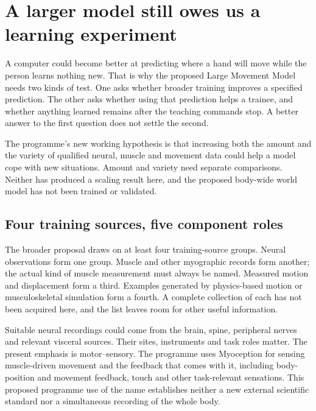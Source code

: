 \section{A larger model still owes us a learning experiment}

A computer could become better at predicting where a hand will move while the person learns nothing new. That is why the proposed Large Movement Model needs two kinds of test. One asks whether broader training improves a specified prediction. The other asks whether using that prediction helps a trainee, and whether anything learned remains after the teaching commands stop. A better answer to the first question does not settle the second.

The programme's new working hypothesis is that increasing both the amount and the variety of qualified neural, muscle and movement data could help a model cope with new situations. Amount and variety need separate comparisons. Neither has produced a scaling result here, and the proposed body-wide world model has not been trained or validated.

\subsection{Four training sources, five component roles}

The broader proposal draws on at least four training-source groups. Neural observations form one group. Muscle and other myographic records form another; the actual kind of muscle measurement must always be named. Measured motion and displacement form a third. Examples generated by physics-based motion or musculoskeletal simulation form a fourth. A complete collection of each has not been acquired here, and the list leaves room for other useful information.

Suitable neural recordings could come from the brain, spine, peripheral nerves and relevant visceral sources. Their sites, instruments and task roles matter. The present emphasis is motor--sensory. The programme uses Myoception for sensing muscle-driven movement and the feedback that comes with it, including body-position and movement feedback, touch and other task-relevant sensations. This proposed programme use of the name establishes neither a new external scientific standard nor a simultaneous recording of the whole body.

